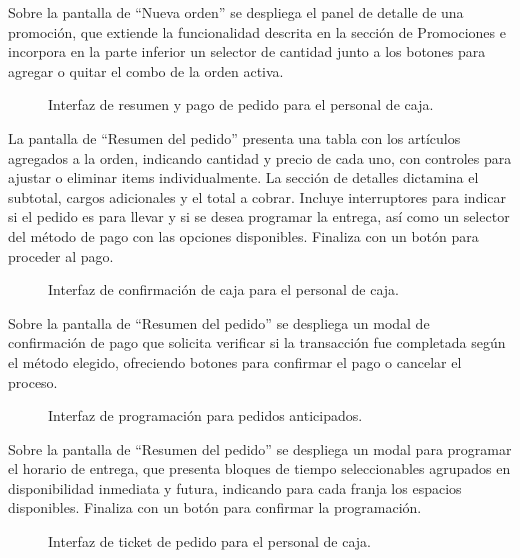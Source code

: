 Sobre la pantalla de ``Nueva orden'' se despliega el panel de detalle de una promoción, que extiende la funcionalidad descrita en la sección de Promociones e incorpora en la parte inferior un selector de cantidad junto a los botones para agregar o quitar el combo de la orden activa.

\begin{figure}[H]
    \centering
    
    \caption{Interfaz de resumen y pago de pedido para el personal de caja.}
    \label{fig:ui-caj-13}
\end{figure}

La pantalla de ``Resumen del pedido'' presenta una tabla con los artículos agregados a la orden, indicando cantidad y precio de cada uno, con controles para ajustar o eliminar items individualmente. La sección de detalles dictamina el subtotal, cargos adicionales y el total a cobrar. Incluye interruptores para indicar si el pedido es para llevar y si se desea programar la entrega, así como un selector del método de pago con las opciones disponibles. Finaliza con un botón para proceder al pago.

\begin{figure}[H]
    \centering
    
    \caption{Interfaz de confirmación de caja para el personal de caja.}
    \label{fig:ui-caj-14}
\end{figure}

Sobre la pantalla de ``Resumen del pedido'' se despliega un modal de confirmación de pago que solicita verificar si la transacción fue completada según el método elegido, ofreciendo botones para confirmar el pago o cancelar el proceso.

\begin{figure}[H]
    \centering
    
    \caption{Interfaz de programación para pedidos anticipados.}
    \label{fig:ui-caj-programacion-entrega}
\end{figure}

Sobre la pantalla de ``Resumen del pedido'' se despliega un modal para programar el horario de entrega, que presenta bloques de tiempo seleccionables agrupados en disponibilidad inmediata y futura, indicando para cada franja los espacios disponibles. Finaliza con un botón para confirmar la programación.

\begin{figure}[H]
    \centering
    
    \caption{Interfaz de ticket de pedido para el personal de caja.}
    \label{fig:ui-caja-ticket-qr}
\end{figure}

